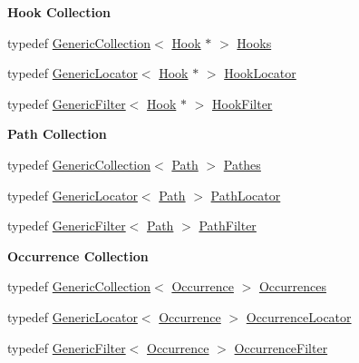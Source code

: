 \begin{Indent}\textbf{ Hook Collection}\par
\begin{DoxyCompactItemize}
\item 
typedef \mbox{\hyperlink{classHurricane_1_1GenericCollection}{Generic\+Collection}}$<$ \mbox{\hyperlink{classHurricane_1_1Hook}{Hook}} $\ast$ $>$ \mbox{\hyperlink{namespaceHurricane_a9dcd9b74dc5e2b51bec7a13c25807e02}{Hooks}}
\item 
typedef \mbox{\hyperlink{classHurricane_1_1GenericLocator}{Generic\+Locator}}$<$ \mbox{\hyperlink{classHurricane_1_1Hook}{Hook}} $\ast$ $>$ \mbox{\hyperlink{namespaceHurricane_aca3a5babe6265eb9f140112d8e8b79e6}{Hook\+Locator}}
\item 
typedef \mbox{\hyperlink{classHurricane_1_1GenericFilter}{Generic\+Filter}}$<$ \mbox{\hyperlink{classHurricane_1_1Hook}{Hook}} $\ast$ $>$ \mbox{\hyperlink{namespaceHurricane_a9287de05984b91e55592a77e8d394324}{Hook\+Filter}}
\end{DoxyCompactItemize}
\end{Indent}
\begin{Indent}\textbf{ Path Collection}\par
\begin{DoxyCompactItemize}
\item 
typedef \mbox{\hyperlink{classHurricane_1_1GenericCollection}{Generic\+Collection}}$<$ \mbox{\hyperlink{classHurricane_1_1Path}{Path}} $>$ \mbox{\hyperlink{namespaceHurricane_a77e8a0f11b7d0d65a47a592f7bdfd061}{Pathes}}
\item 
typedef \mbox{\hyperlink{classHurricane_1_1GenericLocator}{Generic\+Locator}}$<$ \mbox{\hyperlink{classHurricane_1_1Path}{Path}} $>$ \mbox{\hyperlink{namespaceHurricane_a4077fe144cc9efa686ec63667b7dd9bf}{Path\+Locator}}
\item 
typedef \mbox{\hyperlink{classHurricane_1_1GenericFilter}{Generic\+Filter}}$<$ \mbox{\hyperlink{classHurricane_1_1Path}{Path}} $>$ \mbox{\hyperlink{namespaceHurricane_af42ed7a6acaba43b9d5f30b789105bc1}{Path\+Filter}}
\end{DoxyCompactItemize}
\end{Indent}
\begin{Indent}\textbf{ Occurrence Collection}\par
\begin{DoxyCompactItemize}
\item 
typedef \mbox{\hyperlink{classHurricane_1_1GenericCollection}{Generic\+Collection}}$<$ \mbox{\hyperlink{classHurricane_1_1Occurrence}{Occurrence}} $>$ \mbox{\hyperlink{namespaceHurricane_a1912927c128eee859af62dbe4cbe0a6b}{Occurrences}}
\item 
typedef \mbox{\hyperlink{classHurricane_1_1GenericLocator}{Generic\+Locator}}$<$ \mbox{\hyperlink{classHurricane_1_1Occurrence}{Occurrence}} $>$ \mbox{\hyperlink{namespaceHurricane_aa3f9cf43b9c8f3050da0a2549bb3d64d}{Occurrence\+Locator}}
\item 
typedef \mbox{\hyperlink{classHurricane_1_1GenericFilter}{Generic\+Filter}}$<$ \mbox{\hyperlink{classHurricane_1_1Occurrence}{Occurrence}} $>$ \mbox{\hyperlink{namespaceHurricane_a4d74662402bde091565f52b77e261560}{Occurrence\+Filter}}
\end{DoxyCompactItemize}
\end{Indent}
